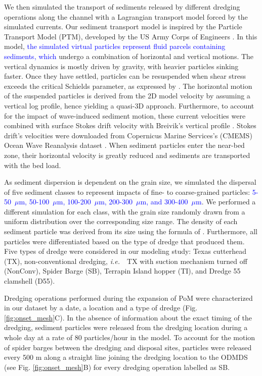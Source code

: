 \documentclass[preprint,12pt,authoryear]{elsarticle}
\newcommand{\ie}{{\it i.e.}\ }
\newcommand{\modif}[1]{\textcolor{blue}{#1}}
\begin{document}
We then simulated the transport of sediments released by different dredging operations along the channel with a Lagrangian transport model forced by the simulated currents. Our sediment transport model is inspired by the Particle Transport Model (PTM), developed by the US Army Corps of Engineers \citep{macdonald2006ptm}. In this model, \modif{the simulated virtual particles represent fluid parcels containing sediments, which} undergo a combination of horizontal and vertical motions. The vertical dynamics is mostly driven by gravity, with heavier particles sinking faster. Once they have settled, particles can be resuspended when shear stress exceeds the critical Schields parameter, as expressed by \cite{soulsby1997threshold}. The horizontal motion of the suspended particles is derived from the 2D model velocity by assuming a vertical log profile, hence yielding a quasi-3D approach. Furthermore, to account for the impact of wave-induced sediment motion, these current velocities were combined with surface Stokes drift velocity with Breivik's vertical profile \citep{breivik2016stokes}. Stokes drift's velocities were downloaded from Copernicus Marine Services's (CMEMS) Ocean Wave Reanalysis dataset \citep{cmems}. When sediment particles enter the near-bed zone, their horizontal velocity is greatly reduced and sediments are transported with the bed load.

As sediment dispersion is dependent on the grain size, we simulated the dispersal of five sediment classes to represent impacts of fine- to coarse-grained particles:  \modif{5-50~$\mu$m, 50-100~$\mu$m, 100-200~$\mu$m, 200-300~$\mu$m, and 300-400~$\mu$m}. We performed a  different simulation for each class, with the grain size randomly drawn from a uniform distribution over the corresponding size range. The density of each sediment particle was derived from its size using the formula of \cite{hamilton1982sound}. Furthermore, all particles were differentiated based on the type of dredge that produced them. Five types of dredge were considered in our modeling study: Texas cutterhead (TX), non-conventional dredging, \ie~TX with suction mechanism turned off (NonConv), Spider Barge (SB), Terrapin Island hopper (TI), and Dredge 55 clamshell (D55).

Dredging operations performed during the expansion of PoM were characterized in our dataset by a date, a location and a type of dredge (Fig. \ref{fig:onset_mesh}C). In the absence of information about the exact timing of the dredging, sediment particles were released from the dredging location during a whole day at a rate of 80 particles/hour in the model. To account for the motion of spider barges between the dredging and disposal sites, particles were released every 500 m along a straight line joining the dredging location to the ODMDS (see Fig. \ref{fig:onset_mesh}B) for every dredging operation labelled as SB.
\end{document}
